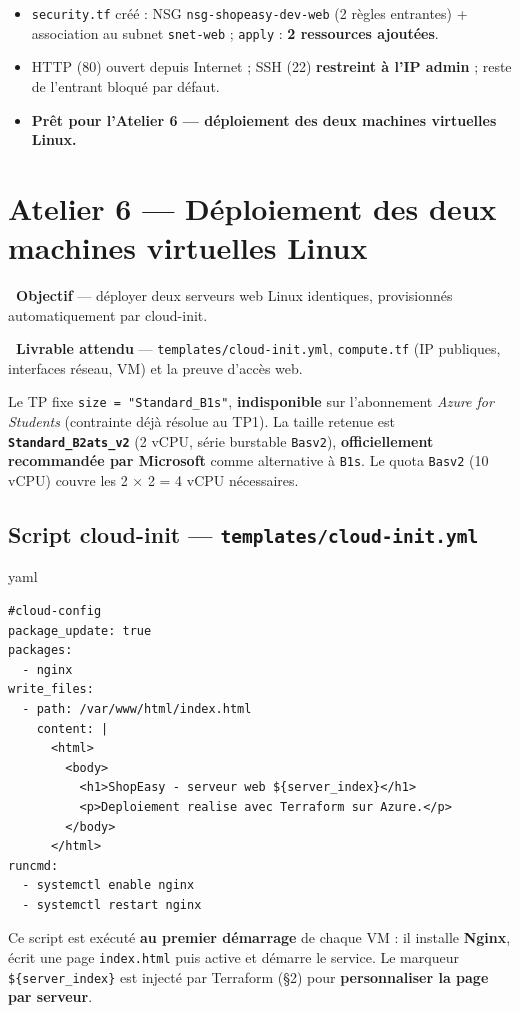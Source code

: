 \documentclass[11pt,a4paper]{article}
\newcommand{\emo}[1]{\raisebox{-0.14em}{\twemoji{#1}}}
\newcommand{\eTarget}{\emo{1f3af}}
\newcommand{\ePackage}{\emo{1f4e6}}
\newcommand{\code}[1]{\texttt{#1}}
\begin{document}
\begin{etatbox}
\begin{itemize}
  \item \code{security.tf} créé : NSG \code{nsg-shopeasy-dev-web} (2 règles entrantes) + association au subnet \code{snet-web} ; \code{apply} : \textbf{2 ressources ajoutées}.
  \item HTTP (80) ouvert depuis Internet ; SSH (22) \textbf{restreint à l'IP admin} ; reste de l'entrant bloqué par défaut.
  \item \textbf{Prêt pour l'Atelier 6 — déploiement des deux machines virtuelles Linux.}
\end{itemize}
\end{etatbox}


\section{Atelier 6 — Déploiement des deux machines virtuelles Linux}

\begin{fiche}
\textbf{\eTarget~Objectif} — déployer deux serveurs web Linux identiques, provisionnés automatiquement par cloud-init.

\textbf{\ePackage~Livrable attendu} — \code{templates/cloud-init.yml}, \code{compute.tf} (IP publiques, interfaces réseau, VM) et la preuve d'accès web.
\end{fiche}

\begin{notebox}
Le TP fixe \code{size = "Standard\_B1s"}, \textbf{indisponible} sur l'abonnement \textit{Azure for Students}
(contrainte déjà résolue au TP1). La taille retenue est \textbf{\code{Standard\_B2ats\_v2}} (2 vCPU, série
burstable \code{Basv2}), \textbf{officiellement recommandée par Microsoft} comme alternative à \code{B1s}. Le
quota \code{Basv2} (10 vCPU) couvre les 2 × 2 = 4 vCPU nécessaires.
\end{notebox}

\subsection{Script cloud-init — \code{templates/cloud-init.yml}}
\begin{codebox}{yaml}
\begin{Verbatim}
#cloud-config
package_update: true
packages:
  - nginx
write_files:
  - path: /var/www/html/index.html
    content: |
      <html>
        <body>
          <h1>ShopEasy - serveur web ${server_index}</h1>
          <p>Deploiement realise avec Terraform sur Azure.</p>
        </body>
      </html>
runcmd:
  - systemctl enable nginx
  - systemctl restart nginx
\end{Verbatim}
\end{codebox}
Ce script est exécuté \textbf{au premier démarrage} de chaque VM : il installe \textbf{Nginx}, écrit une page
\code{index.html} puis active et démarre le service. Le marqueur \code{\$\{server\_index\}} est injecté par
Terraform (§2) pour \textbf{personnaliser la page par serveur}.
\end{document}
